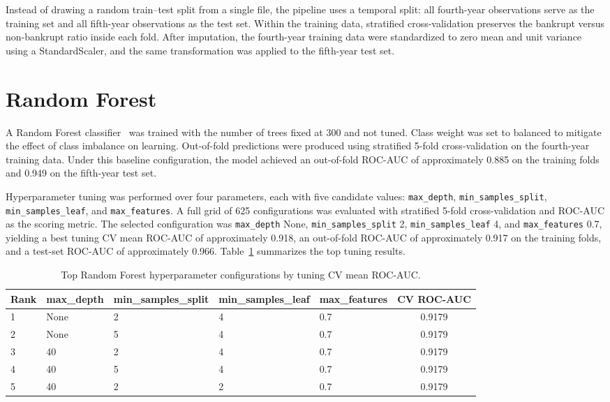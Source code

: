 \documentclass[11pt]{article}
\begin{document}
Instead of drawing a random train--test split from a single file, the pipeline uses a temporal split: all fourth-year observations serve as the training set and all fifth-year observations as the test set. Within the training data, stratified cross-validation preserves the bankrupt versus non-bankrupt ratio inside each fold. After imputation, the fourth-year training data were standardized to zero mean and unit variance using a StandardScaler, and the same transformation was applied to the fifth-year test set.

\section{Random Forest}

A Random Forest classifier~\cite{breiman2001} was trained with the number of trees fixed at 300 and not tuned. Class weight was set to balanced to mitigate the effect of class imbalance on learning. Out-of-fold predictions were produced using stratified 5-fold cross-validation on the fourth-year training data. Under this baseline configuration, the model achieved an out-of-fold ROC-AUC of approximately 0.885 on the training folds and 0.949 on the fifth-year test set.

Hyperparameter tuning was performed over four parameters, each with five candidate values: \texttt{max\_depth}, \texttt{min\_samples\_split}, \texttt{min\_samples\_leaf}, and \texttt{max\_features}. A full grid of 625 configurations was evaluated with stratified 5-fold cross-validation and ROC-AUC as the scoring metric. The selected configuration was \texttt{max\_depth} None, \texttt{min\_samples\_split} 2, \texttt{min\_samples\_leaf} 4, and \texttt{max\_features} 0.7, yielding a best tuning CV mean ROC-AUC of approximately 0.918, an out-of-fold ROC-AUC of approximately 0.917 on the training folds, and a test-set ROC-AUC of approximately 0.966. Table~\ref{tab:rf_tuning} summarizes the top tuning results.

\begin{table}[!htbp]
\centering
\caption{Top Random Forest hyperparameter configurations by tuning CV mean ROC-AUC.}
\label{tab:rf_tuning}
\begin{tabular}{lllllc}
\toprule
Rank & max\_depth & min\_samples\_split & min\_samples\_leaf & max\_features & CV ROC-AUC \\
\midrule
1 & None & 2 & 4 & 0.7 & 0.9179 \\
2 & None & 5 & 4 & 0.7 & 0.9179 \\
3 & 40 & 2 & 4 & 0.7 & 0.9179 \\
4 & 40 & 5 & 4 & 0.7 & 0.9179 \\
5 & 40 & 2 & 2 & 0.7 & 0.9179 \\
\bottomrule
\end{tabular}
\end{table}
\FloatBarrier
\end{document}
